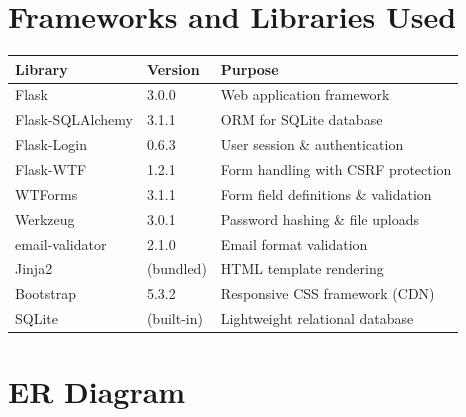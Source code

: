 \documentclass[12pt,a4paper]{article}
\begin{document}
\section{Frameworks and Libraries Used}

\begin{tabularx}{\textwidth}{|l|l|X|}
\hline
\textbf{Library}        & \textbf{Version} & \textbf{Purpose}                    \\ \hline
Flask                   & 3.0.0            & Web application framework           \\ \hline
Flask-SQLAlchemy        & 3.1.1            & ORM for SQLite database             \\ \hline
Flask-Login             & 0.6.3            & User session \& authentication      \\ \hline
Flask-WTF               & 1.2.1            & Form handling with CSRF protection  \\ \hline
WTForms                 & 3.1.1            & Form field definitions \& validation\\ \hline
Werkzeug                & 3.0.1            & Password hashing \& file uploads    \\ \hline
email-validator         & 2.1.0            & Email format validation             \\ \hline
Jinja2                  & (bundled)        & HTML template rendering             \\ \hline
Bootstrap               & 5.3.2            & Responsive CSS framework (CDN)      \\ \hline
SQLite                  & (built-in)       & Lightweight relational database     \\ \hline
\end{tabularx}

\section{ER Diagram}
\end{document}
